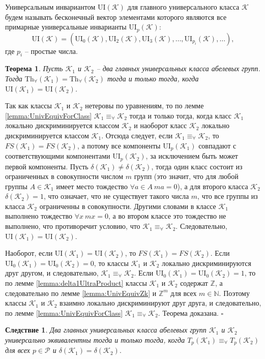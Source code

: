 \documentclass[a4paper,11pt,twoside]{article}
\newtheorem{theorem}{Теорема}[section]
\newtheorem{corollary}{Следствие}[section]
\def\proof{{\noindent{\bf Доказательство.}} }
\def\K{{\mathcal{K}}}
\def\P{{\mathcal{P}}}
\def\Z{{\mathbb{Z}}}
\def\N{{\mathbb{N}}}
\def\Tha{{\mathrm{Th}_\forall}}
\def\ui{{\mathrm{UI}}}
\begin{document}
Универсальным инвариантом $\ui(\K)$ для главного универсального класса $\K$ будем называть бесконечный вектор элементами которого являются все примарные универсальные инварианты $\ui_p(\K)$:
$$\ui(\K) = (\ui_0(\K), \ui_2(\K), \ui_3(\K), \ldots, \ui_{p_i}(\K), \ldots ),$$
где $p_i$ -- простые числа.


\begin{theorem}\label{th:UnivEquivMainClasses}
Пусть $\K_1$ и $\K_2$ -- два главных универсальных класса абелевых групп. Тогда $\Tha(\K_1) = \Tha(\K_2)$ тогда и только тогда, когда $\ui(\K_1) = \ui(\K_2)$.
\end{theorem}
\proof Так как классы $\K_1$ и $\K_2$ нетеровы по уравнениям, то по лемме \ref{lemma:UnivEquivForClass} $\K_1 \equiv_\forall \K_2$ тогда и только тогда, когда класс $\K_1$ локально дискриминируется классом $\K_2$ и наоборот класс $\K_2$ локально дискриминируется классом $\K_1$. Отсюда следует, если $\K_1 \equiv_\forall \K_2$, то $FS(\K_1) = FS(\K_2)$, а потому все компоненты $\ui_p(\K_1)$ совпадают с соответствующими компонентами $\ui_p(\K_2)$, за исключением быть может первой компоненты. Пусть $\delta(\K_1) \neq \delta(\K_2)$, тогда один класс состоит из ограниченных в совокупности числом $m$ групп (это значит, что для любой группы $A \in \K_1$ имеет место тождество $\forall a \in A \ ma = 0$), а для второго класса $\K_2$ $\delta(\K_2) = 1$, что означает, что не существует такого числа $m$, что все группы из класса $\K_2$ ограниченны в совокупности. Другими словами в классе $\K_1$ выполнено тождество $\forall x \ mx = 0$, а во втором классе это тождество не выполнено, что противоречит условию, что $\K_1 \equiv_\forall \K_2$. Следовательно, $\ui(\K_1) = \ui(\K_2)$.

Наоборот, если $\ui(\K_1) = \ui(\K_2)$, то $FS(\K_1) = FS(\K_2)$. Если $\ui_0(\K_1) = \ui_0(\K_2) = 0$, то классы $\K_1$ и $\K_2$ локально дискриминируются друг другом, и следовательно, $\K_1 \equiv_\forall \K_2$. Если $\ui_0(\K_1) = \ui_0(\K_2) = 1$, то по лемме \ref{lemma:delta1UltraProduct} классы $\K_1$ и $\K_2$ содержат $\Z$, а следовательно по лемме \ref{lemma:UnivEquivZk} и $\Z^m$ для всех $m \in \N$. Поэтому классы $\K_1$ и $\K_2$ взаимно локально дискриминируют друг друга, и следовательно, по лемме \ref{lemma:UnivEquivForClass} $\K_1 \equiv_\forall \K_2$. Теорема доказана. $\square$

\begin{corollary}
Два главных универсальных класса абелевых групп $\K_1$ и $\K_2$ универсально эквивалентны тогда и только тогда, когда $T_p(\K_1) \equiv_\forall T_p(\K_2)$ для всех $p \in \P$ и $\delta(\K_1) = \delta(\K_2).$
\end{corollary}
\end{document}
